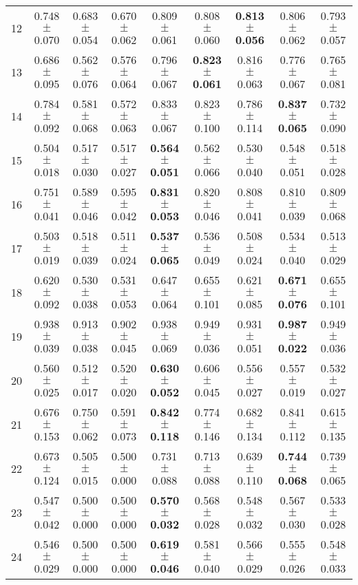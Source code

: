 \begin{table}[!ht]
{\begin{tabular}{r c c c c c c c c}
12 & 0.748 $\pm$ 0.070 & 0.683 $\pm$ 0.054 & 0.670 $\pm$ 0.062 & 0.809 $\pm$ 0.061 & 0.808 $\pm$ 0.060 & \textbf{0.813 $\pm$ 0.056} & 0.806 $\pm$ 0.062 & 0.793 $\pm$ 0.057 \\
13 & 0.686 $\pm$ 0.095 & 0.562 $\pm$ 0.076 & 0.576 $\pm$ 0.064 & 0.796 $\pm$ 0.067 & \textbf{0.823 $\pm$ 0.061} & 0.816 $\pm$ 0.063 & 0.776 $\pm$ 0.067 & 0.765 $\pm$ 0.081 \\
14 & 0.784 $\pm$ 0.092 & 0.581 $\pm$ 0.068 & 0.572 $\pm$ 0.063 & 0.833 $\pm$ 0.067 & 0.823 $\pm$ 0.100 & 0.786 $\pm$ 0.114 & \textbf{0.837 $\pm$ 0.065} & 0.732 $\pm$ 0.090 \\
15 & 0.504 $\pm$ 0.018 & 0.517 $\pm$ 0.030 & 0.517 $\pm$ 0.027 & \textbf{0.564 $\pm$ 0.051} & 0.562 $\pm$ 0.066 & 0.530 $\pm$ 0.040 & 0.548 $\pm$ 0.051 & 0.518 $\pm$ 0.028 \\
16 & 0.751 $\pm$ 0.041 & 0.589 $\pm$ 0.046 & 0.595 $\pm$ 0.042 & \textbf{0.831 $\pm$ 0.053} & 0.820 $\pm$ 0.046 & 0.808 $\pm$ 0.041 & 0.810 $\pm$ 0.039 & 0.809 $\pm$ 0.068 \\
17 & 0.503 $\pm$ 0.019 & 0.518 $\pm$ 0.039 & 0.511 $\pm$ 0.024 & \textbf{0.537 $\pm$ 0.065} & 0.536 $\pm$ 0.049 & 0.508 $\pm$ 0.024 & 0.534 $\pm$ 0.040 & 0.513 $\pm$ 0.029 \\
18 & 0.620 $\pm$ 0.092 & 0.530 $\pm$ 0.038 & 0.531 $\pm$ 0.053 & 0.647 $\pm$ 0.064 & 0.655 $\pm$ 0.101 & 0.621 $\pm$ 0.085 & \textbf{0.671 $\pm$ 0.076} & 0.655 $\pm$ 0.101 \\
19 & 0.938 $\pm$ 0.039 & 0.913 $\pm$ 0.038 & 0.902 $\pm$ 0.045 & 0.938 $\pm$ 0.069 & 0.949 $\pm$ 0.036 & 0.931 $\pm$ 0.051 & \textbf{0.987 $\pm$ 0.022} & 0.949 $\pm$ 0.036 \\
20 & 0.560 $\pm$ 0.025 & 0.512 $\pm$ 0.017 & 0.520 $\pm$ 0.020 & \textbf{0.630 $\pm$ 0.052} & 0.606 $\pm$ 0.045 & 0.556 $\pm$ 0.027 & 0.557 $\pm$ 0.019 & 0.532 $\pm$ 0.027 \\
21 & 0.676 $\pm$ 0.153 & 0.750 $\pm$ 0.062 & 0.591 $\pm$ 0.073 & \textbf{0.842 $\pm$ 0.118} & 0.774 $\pm$ 0.146 & 0.682 $\pm$ 0.134 & 0.841 $\pm$ 0.112 & 0.615 $\pm$ 0.135 \\
22 & 0.673 $\pm$ 0.124 & 0.505 $\pm$ 0.015 & 0.500 $\pm$ 0.000 & 0.731 $\pm$ 0.088 & 0.713 $\pm$ 0.088 & 0.639 $\pm$ 0.110 & \textbf{0.744 $\pm$ 0.068} & 0.739 $\pm$ 0.065 \\
23 & 0.547 $\pm$ 0.042 & 0.500 $\pm$ 0.000 & 0.500 $\pm$ 0.000 & \textbf{0.570 $\pm$ 0.032} & 0.568 $\pm$ 0.028 & 0.548 $\pm$ 0.032 & 0.567 $\pm$ 0.030 & 0.533 $\pm$ 0.028 \\
24 & 0.546 $\pm$ 0.029 & 0.500 $\pm$ 0.000 & 0.500 $\pm$ 0.000 & \textbf{0.619 $\pm$ 0.046} & 0.581 $\pm$ 0.040 & 0.566 $\pm$ 0.029 & 0.555 $\pm$ 0.026 & 0.548 $\pm$ 0.033 \\

\end{tabular}}
\end{table}
